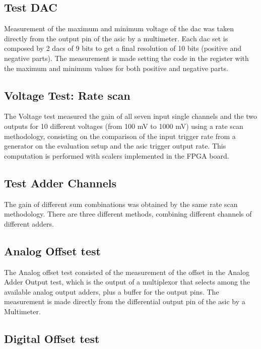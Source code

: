 \documentclass[main.tex]{subfiles}
\begin{document}
\subsection{Test DAC}

Measurement of the maximum and minimum voltage of the \gls{dac} was taken directly from the output pin of the \gls{asic} by a multimeter. Each \gls{dac} set is composed by 2 \glspl{dac} of 9 bits to get a final resolution of 10 bits (positive and negative parts). The measurement is made setting the code in the register with the maximum and minimum values for both positive and negative parts.

\subsection{Voltage Test: Rate scan} \label{sec:ratescan}

The Voltage test measured the gain of all seven input single channels and the two outputs for 10 different voltages (from 100 mV to 1000 mV) using a rate scan methodology, consisting on the comparison of the input trigger rate from a generator on the evaluation setup and the \gls{asic} trigger output rate. This computation is performed with scalers implemented in the FPGA board.

\subsection{Test Adder Channels}

The gain of different sum combinations was obtained by the same rate scan methodology. There are three different methods, combining different channels of different adders.

\subsection{Analog Offset test}

The Analog offset test consisted of the measurement of the offset in the Analog Adder Output test, which is the output of a multiplexor that selects among the available analog output adders, plus a buffer for the output pins. The measurement is made directly from the differential output pin of the \gls{asic} by a Multimeter.

\subsection{Digital Offset test} \label{sec:digoff}
\end{document}
